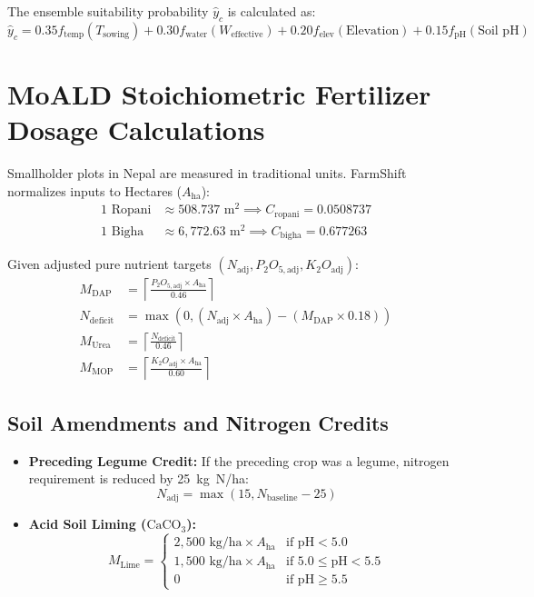 \documentclass[11pt,a4paper]{report}
\begin{document}
The ensemble suitability probability $\hat{y}_c$ is calculated as:
\begin{equation}
  \hat{y}_c = 0.35 f_{\text{temp}}(T_{\text{sowing}}) + 0.30 f_{\text{water}}(W_{\text{effective}}) + 0.20 f_{\text{elev}}(\text{Elevation}) + 0.15 f_{\text{pH}}(\text{Soil pH})
\end{equation}

\section{MoALD Stoichiometric Fertilizer Dosage Calculations}
Smallholder plots in Nepal are measured in traditional units. FarmShift normalizes inputs to Hectares ($A_{\text{ha}}$):
\begin{align}
  1\text{ Ropani} &\approx 508.737\text{ m}^2 \implies C_{\text{ropani}} = 0.0508737 \\
  1\text{ Bigha} &\approx 6,772.63\text{ m}^2 \implies C_{\text{bigha}} = 0.677263
\end{align}

Given adjusted pure nutrient targets $(N_{\text{adj}}, P_2O_{5,\text{adj}}, K_2O_{\text{adj}})$:
\begin{align}
  M_{\text{DAP}} &= \left\lceil \frac{P_2O_{5,\text{adj}} \times A_{\text{ha}}}{0.46} \right\rceil \\
  N_{\text{deficit}} &= \max\left(0, (N_{\text{adj}} \times A_{\text{ha}}) - (M_{\text{DAP}} \times 0.18)\right) \\
  M_{\text{Urea}} &= \left\lceil \frac{N_{\text{deficit}}}{0.46} \right\rceil \\
  M_{\text{MOP}} &= \left\lceil \frac{K_2O_{\text{adj}} \times A_{\text{ha}}}{0.60} \right\rceil
\end{align}

\subsection{Soil Amendments and Nitrogen Credits}
\begin{itemize}
  \item \textbf{Preceding Legume Credit:} If the preceding crop was a legume, nitrogen requirement is reduced by 25~kg~N/ha:
  \begin{equation}
    N_{\text{adj}} = \max(15, N_{\text{baseline}} - 25)
  \end{equation}
  \item \textbf{Acid Soil Liming ($\text{CaCO}_3$):}
  \begin{equation}
    M_{\text{Lime}} = \begin{cases}
      2,500\text{ kg/ha} \times A_{\text{ha}} & \text{if } \text{pH} < 5.0 \\
      1,500\text{ kg/ha} \times A_{\text{ha}} & \text{if } 5.0 \le \text{pH} < 5.5 \\
      0 & \text{if } \text{pH} \ge 5.5
    \end{cases}
  \end{equation}
\end{itemize}
\end{document}
